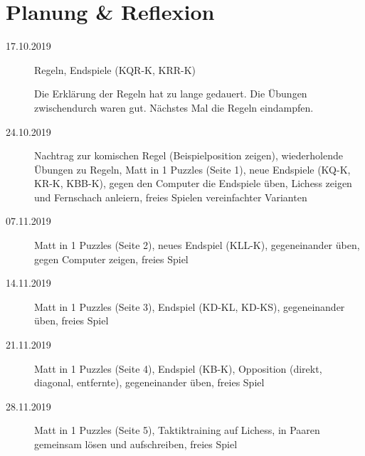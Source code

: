 \documentclass[
  a4paper,
  justified,
  nobib,
]{tufte-handout}
\begin{document}
\section{Planung \& Reflexion}%
\label{sec:planung_reflexion}

\begin{description}
  \item[17.10.2019] Regeln, Endspiele (KQR-K, KRR-K)

    Die Erklärung der Regeln hat zu lange gedauert.
    Die Übungen zwischendurch waren gut.
    Nächstes Mal die Regeln eindampfen.

  \item[24.10.2019] Nachtrag zur komischen Regel (Beispielposition zeigen),
    wiederholende Übungen zu Regeln,
    Matt in 1 Puzzles (Seite 1),
    neue Endspiele (KQ-K, KR-K, KBB-K),
    gegen den Computer die Endspiele üben,
    Lichess zeigen und Fernschach anleiern,
    freies Spielen vereinfachter Varianten

  \item[07.11.2019] Matt in 1 Puzzles (Seite 2),
    neues Endspiel (KLL-K),
    gegeneinander üben,
    gegen Computer zeigen,
    freies Spiel

  \item[14.11.2019] Matt in 1 Puzzles (Seite 3),
    Endspiel (KD-KL, KD-KS),
    gegeneinander üben,
    freies Spiel

  \item[21.11.2019] Matt in 1 Puzzles (Seite 4),
    Endspiel (KB-K),
    Opposition (direkt, diagonal, entfernte),
    gegeneinander üben,
    freies Spiel

  \item[28.11.2019] Matt in 1 Puzzles (Seite 5),
    Taktiktraining auf Lichess,
    in Paaren gemeinsam lösen und aufschreiben,
    freies Spiel
\end{description}
\end{document}
